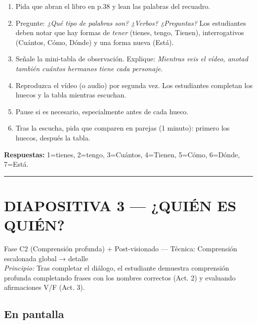 \documentclass[a4paper,11pt]{article}
\begin{document}
\begin{enumerate}[leftmargin=1.5cm, itemsep=4pt]
\item Pida que abran el libro en p.38 y lean las palabras del recuadro.
\item Pregunte: \textit{¿Qué tipo de palabras son? ¿Verbos? ¿Preguntas?} Los estudiantes deben notar que hay formas de \textit{tener} (tienes, tengo, Tienen), interrogativos (Cuántos, Cómo, Dónde) y una forma nueva (Está).
\item Señale la mini-tabla de observación. Explique: \textit{Mientras veis el vídeo, anotad también cuántos hermanos tiene cada personaje.}
\item Reproduzca el vídeo (o audio) por segunda vez. Los estudiantes completan los huecos y la tabla mientras escuchan.
\item Pause si es necesario, especialmente antes de cada hueco.
\item Tras la escucha, pida que comparen en parejas (1 minuto): primero los huecos, después la tabla.
\end{enumerate}

\vspace{0.3cm}

\noindent\textbf{Respuestas:} 1=tienes, 2=tengo, 3=Cuántos, 4=Tienen, 5=Cómo, 6=Dónde, 7=Está.

\newpage


\noindent\textcolor{violeta}{\rule{\linewidth}{2.5pt}}

\section*{DIAPOSITIVA 3 — ¿QUIÉN ES QUIÉN?}

{\small Fase C2 (Comprensión profunda) + Post-visionado — Técnica: Comprensión escalonada global → detalle}\\
{\small\textit{Principio:} Tras completar el diálogo, el estudiante demuestra comprensión profunda completando frases con los nombres correctos (Act. 2) y evaluando afirmaciones V/F (Act. 3).}

\vspace{0.5cm}

\subsection*{En pantalla}
\end{document}
